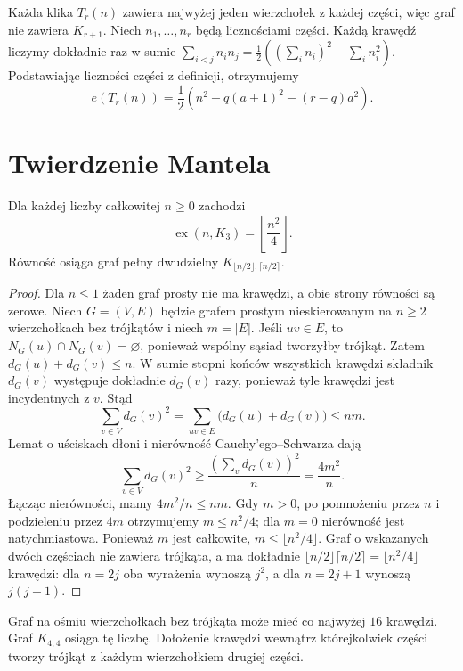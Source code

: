 Każda klika $T_r(n)$ zawiera najwyżej jeden wierzchołek
z każdej części, więc graf nie zawiera $K_{r+1}$.
Niech $n_1,\ldots,n_r$ będą licznościami części.
Każdą krawędź liczymy dokładnie raz w sumie
$\sum_{i<j}n_in_j=\tfrac12((\sum_i n_i)^2-\sum_i n_i^2)$.
Podstawiając liczności części z definicji, otrzymujemy
\[
e(T_r(n))=\frac12\left(n^2-q(a+1)^2-(r-q)a^2\right).
\]

\section{Twierdzenie Mantela}
\label{sec:tg-extremal-mantel}

\begin{twierdzenie}
\label{thm:tg-mantel}
Dla każdej liczby całkowitej $n\geq0$ zachodzi
\[
\operatorname{ex}(n,K_3)=\left\lfloor\frac{n^2}{4}\right\rfloor.
\]
Równość osiąga graf pełny dwudzielny
$K_{\lfloor n/2\rfloor,\lceil n/2\rceil}$.
\end{twierdzenie}
\begin{proof}
Dla $n\leq1$ żaden graf prosty nie ma krawędzi,
a obie strony równości są zerowe.
Niech $G=(V,E)$ będzie grafem prostym nieskierowanym
na $n\geq2$ wierzchołkach bez trójkątów i niech $m=|E|$.
Jeśli $uv\in E$, to $N_G(u)\cap N_G(v)=\varnothing$,
ponieważ wspólny sąsiad tworzyłby trójkąt.
Zatem $d_G(u)+d_G(v)\leq n$.
W sumie stopni końców wszystkich krawędzi składnik
$d_G(v)$ występuje dokładnie $d_G(v)$ razy, ponieważ
tyle krawędzi jest incydentnych z $v$. Stąd
\[
\sum_{v\in V}d_G(v)^2
=\sum_{uv\in E}\bigl(d_G(u)+d_G(v)\bigr)\leq nm.
\]
Lemat o uściskach dłoni i nierówność
Cauchy'ego--Schwarza dają
\[
\sum_{v\in V}d_G(v)^2
\geq\frac{(\sum_vd_G(v))^2}{n}=\frac{4m^2}{n}.
\]
Łącząc nierówności, mamy $4m^2/n\leq nm$.
Gdy $m>0$, po pomnożeniu przez $n$ i podzieleniu
przez $4m$ otrzymujemy $m\leq n^2/4$;
dla $m=0$ nierówność jest natychmiastowa.
Ponieważ $m$ jest całkowite,
$m\leq\lfloor n^2/4\rfloor$.
Graf o wskazanych dwóch częściach
nie zawiera trójkąta, a ma dokładnie
$\lfloor n/2\rfloor\lceil n/2\rceil
=\lfloor n^2/4\rfloor$ krawędzi: dla $n=2j$ oba wyrażenia
wynoszą $j^2$, a dla $n=2j+1$ wynoszą $j(j+1)$.
\end{proof}

\begin{przyklad}
\label{ex:tg-mantel-8}
Graf na ośmiu wierzchołkach bez trójkąta
może mieć co najwyżej $16$ krawędzi.
Graf $K_{4,4}$ osiąga tę liczbę.
Dołożenie krawędzi wewnątrz którejkolwiek
części tworzy trójkąt z każdym wierzchołkiem
drugiej części.
\end{przyklad}

